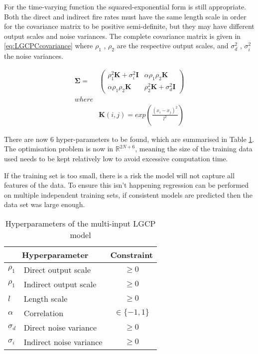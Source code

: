 \documentclass[a4paper,11pt]{report}
\begin{document}
For the time-varying function the squared-exponential form is still appropriate. Both the direct and indirect fire rates must have the same length scale in order for the covariance matrix to be positive semi-definite, but they may have different output scales and noise variances. The complete covariance matrix is given in \ref{eq:LGCPCcovariance} where \(\rho_1\) , \(\rho_2\) are the respective output scales, and \(\sigma_d^2\) , \(\sigma_i^2\) the noise variances.

\begin{equation} \label{eq:LGCPCcovariance}
\begin{aligned}
\boldsymbol{\Sigma} =&  \left( \begin{array}{cc}
\rho_1^2 \mathbf{K} + \sigma_i^2 \mathbf{I} & \alpha \rho_1 \rho_2 \mathbf{K}  \\
\alpha \rho_1 \rho_2 \mathbf{K} & \rho_2^2 \mathbf{K} + \sigma_d^2 \mathbf{I} \end{array} \right) \\ where\\
&\mathbf{K}(i,j) = exp\left( \frac{(x_i-x_j)^2}{l^2}\right)
\end{aligned}
\end{equation}

There are now 6 hyper-parameters to be found, which are summarised in Table \ref{LGCPChyperparameters}. The optimisation problem is now in \(\mathds{R}^{2N+6}\), meaning the size of the training data used needs to be kept relatively low to avoid excessive computation time. \par

If the training set is too small, there is a risk the model will not capture all features of the data. To ensure this isn't happening regression can be performed on multiple independent training sets, if consistent models are predicted then the data set was large enough.

\begin{table}[]
\centering
\caption{Hyperparameters of the multi-input LGCP model}
\label{LGCPChyperparameters}
\begin{tabular}{ll|c}
\multicolumn{2}{c|}{\textbf{Hyperparameter}} & \textbf{Constraint} \\ \hline
\(\rho_1\)           & Direct output scale             & \(\geq0\)            \\
\(\rho_1\)             & Indirect output scale           & \(\geq0\)            \\
\(l\)          & Length scale                    & \(\geq0\)            \\
\(\alpha\)             & Correlation                     &  \(\in\{-1,1\}\)                   \\
\(\sigma_d\)             & Direct noise variance           &    \(\geq0\)                 \\
\(\sigma_i\)           & Indirect noise variance         &     \(\geq0\)               
\end{tabular}
\end{table}
\end{document}
